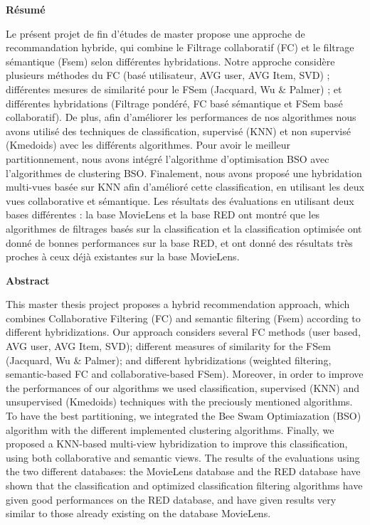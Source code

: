 \thispagestyle{empty}
\begin{center}
	\textbf{\LARGE Résumé}
\end{center}

Le présent projet de fin d’études de master propose une approche de recommandation hybride, qui combine le Filtrage collaboratif (FC) et le filtrage sémantique (Fsem) selon différentes hybridations. Notre approche considère plusieurs méthodes du FC (basé utilisateur, AVG user, AVG Item, SVD) ; différentes mesures de similarité pour le FSem (Jacquard, Wu \& Palmer) ; et différentes hybridations (Filtrage pondéré, FC basé sémantique et FSem basé collaboratif). De plus, afin d’améliorer les performances de nos algorithmes nous avons utilisé des techniques de classification, supervisé (KNN) et non supervisé (Kmedoids) avec les différents algorithmes. Pour avoir le meilleur partitionnement, nous avons intégré l’algorithme d’optimisation BSO avec l’algorithmes de clustering BSO. Finalement, nous avons proposé une hybridation multi-vues basée sur KNN afin d’amélioré cette classification, en utilisant les deux vues collaborative et sémantique.
Les résultats des évaluations en utilisant deux bases différentes : la base MovieLens et la base RED ont montré que les algorithmes de filtrages basés sur la classification et la classification optimisée ont donné de bonnes performances sur la base RED, et ont donné des résultats très proches à ceux déjà existantes sur la base MovieLens.
\thispagestyle{empty}
\begin{center}
	\textbf{\LARGE 
		Abstract}
\end{center}
This master thesis project proposes a hybrid recommendation approach, which combines Collaborative Filtering (FC) and semantic filtering (Fsem) according to different hybridizations. Our approach considers several FC methods (user based, AVG user, AVG Item, SVD); different measures of similarity for the FSem (Jacquard, Wu \& Palmer); and different hybridizations (weighted filtering, semantic-based FC and collaborative-based FSem). Moreover, in order to improve the performances of our algorithms we used classification, supervised (KNN) and unsupervised (Kmedoids) techniques with the preciously mentioned algorithms. To have the best partitioning, we integrated the Bee Swam Optimiazation (BSO) algorithm with the different implemented clustering algorithms. Finally, we proposed a KNN-based multi-view hybridization to improve this classification, using both collaborative and semantic views.
The results of the evaluations using the two different databases: the MovieLens database and the RED database have shown that the classification and optimized classification filtering algorithms have given good performances on the RED database, and have given results very similar to those already existing on the database MovieLens.